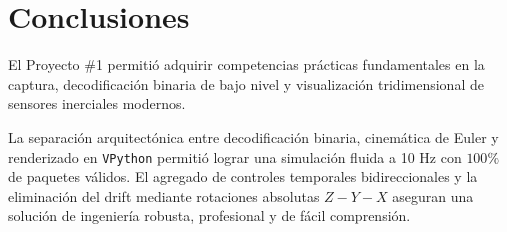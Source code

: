 \documentclass[12pt,letterpaper]{article}
\begin{document}
\section{Conclusiones}

El Proyecto \#1 permitió adquirir competencias prácticas fundamentales en la captura, decodificación binaria de bajo nivel y visualización tridimensional de sensores inerciales modernos. 

La separación arquitectónica entre decodificación binaria, cinemática de Euler y renderizado en \texttt{VPython} permitió lograr una simulación fluida a 10 Hz con $100\%$ de paquetes válidos. El agregado de controles temporales bidireccionales y la eliminación del drift mediante rotaciones absolutas $Z-Y-X$ aseguran una solución de ingeniería robusta, profesional y de fácil comprensión.
\end{document}
